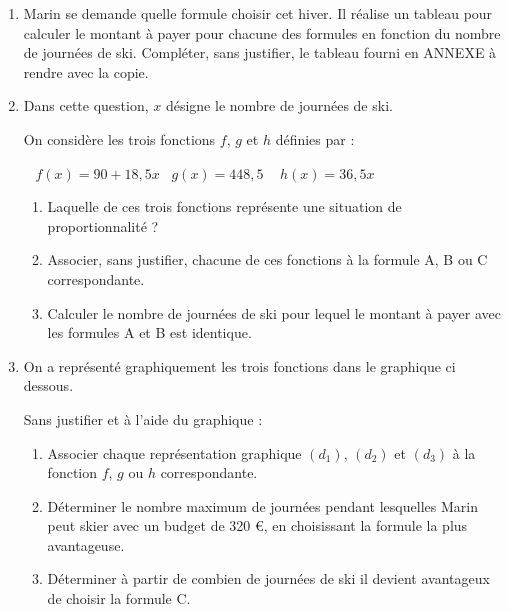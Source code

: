 \begin{enumerate}
	\item Marin se demande quelle formule choisir cet hiver. Il réalise un tableau pour calculer le montant à payer pour chacune des formules en fonction du nombre de journées de ski. Compléter, sans justifier, le tableau fourni en ANNEXE à rendre avec la copie.
	
	\item Dans cette question, $x$ désigne le nombre de journées de ski.
	
	On considère les trois fonctions $f$, $g$ et $h$ définies par :
	
	\hfill~ $f(x) = 90 + 18,5x$\hfill~ $g(x) = 448,5$ \hfill~ $	h(x) = 36,5x$\hfill~
	
	\begin{enumerate}
		\item Laquelle de ces trois fonctions représente une situation de proportionnalité ?
		
		\item Associer, sans justifier, chacune de ces fonctions à la formule A, B ou C correspondante.
		
		\item Calculer le nombre de journées de ski pour lequel le montant à payer avec les formules A et B est identique.
	\end{enumerate}

	\item On a représenté graphiquement les trois fonctions dans le graphique ci dessous.
	
	Sans justifier et à l'aide du graphique :
	
	\begin{enumerate}
		\item Associer chaque représentation graphique $(d_1)$, $(d_2)$ et $(d_3)$ à la fonction $f$, $g$ ou $h$ correspondante.
		
		\item Déterminer le nombre maximum de journées pendant lesquelles Marin peut skier avec un budget de 320 \euro{}, en choisissant la formule la plus avantageuse.
		
		\item Déterminer à partir de combien de journées de ski il devient avantageux de choisir la formule C.
	\end{enumerate}
\end{enumerate}

